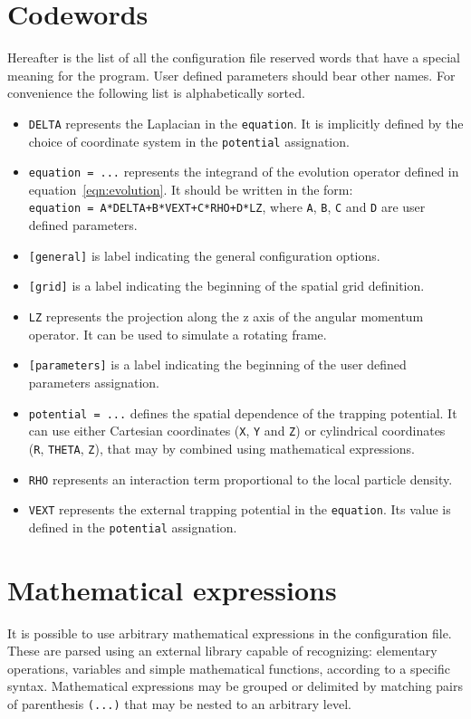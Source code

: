 \documentclass[12pt,a4paper]{report}
\begin{document}
\section{Codewords}
Hereafter is the list of all the configuration file reserved words that have a special meaning for the program.
User defined parameters should bear other names.
For convenience the following list is alphabetically sorted.
\begin{itemize}
\item \texttt{DELTA} represents the Laplacian in the \texttt{equation}. It is implicitly defined by the choice of coordinate system in the \texttt{potential} assignation.
\item \texttt{equation = ...} represents the integrand of the evolution operator defined in equation~\eqref{eqn:evolution}. It should be written in the form:\\ \texttt{equation = A*DELTA+B*VEXT+C*RHO+D*LZ}, where \texttt{A}, \texttt{B}, \texttt{C} and \texttt{D} are user defined parameters.
\item \texttt{[general]} is label indicating the general configuration options.
\item \texttt{[grid]} is a label indicating the beginning of the spatial grid definition.
\item \texttt{LZ} represents the projection along the z axis of the angular momentum operator. It can be used to simulate a rotating frame. 
\item \texttt{[parameters]} is a label indicating the beginning of the user defined parameters assignation.
\item \texttt{potential = ...} defines the spatial dependence of the trapping potential. It can use either Cartesian coordinates (\texttt{X}, \texttt{Y} and \texttt{Z}) or cylindrical coordinates (\texttt{R}, \texttt{THETA}, \texttt{Z}), that may by combined using mathematical expressions.
\item \texttt{RHO} represents an interaction term proportional to the local particle density.
\item \texttt{VEXT} represents the external trapping potential in the \texttt{equation}. Its value is defined in the \texttt{potential} assignation.
\end{itemize}

\section{Mathematical expressions}
It is possible to use arbitrary mathematical expressions in the configuration file.
These are parsed using an external library capable of recognizing: elementary operations, variables and simple mathematical functions, according to a specific syntax.
Mathematical expressions may be grouped or delimited by matching pairs of parenthesis \texttt{(...)} that may be nested to an arbitrary level.
\end{document}
